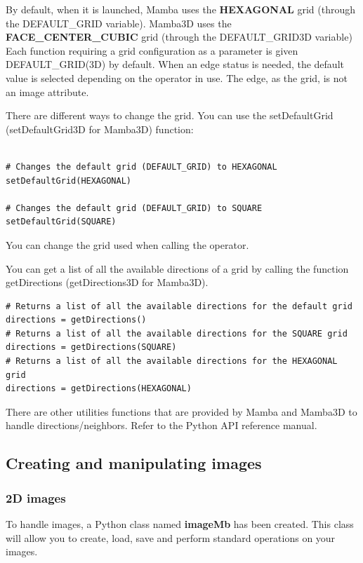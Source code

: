 \documentclass[a4paper,10pt,oneside]{article}
\begin{document}
By default, when it is launched, Mamba uses the \textbf{HEXAGONAL} grid (through 
the DEFAULT\_GRID variable). Mamba3D uses the \textbf{FACE\_CENTER\_CUBIC} grid
(through the DEFAULT\_GRID3D variable)  Each function requiring a grid
configuration as a parameter is given DEFAULT\_GRID(3D) by default. When an
edge status is needed, the default value is selected depending on the operator
in use. The edge, as the grid, is not an image attribute.

There are different ways to change the grid. You can use the setDefaultGrid 
(setDefaultGrid3D for Mamba3D) function:

\lstset{language=Python}
\begin{lstlisting}

# Changes the default grid (DEFAULT_GRID) to HEXAGONAL
setDefaultGrid(HEXAGONAL)

# Changes the default grid (DEFAULT_GRID) to SQUARE
setDefaultGrid(SQUARE)
\end{lstlisting}

You can change the grid used when calling the operator.

You can get a list of all the available directions of a grid
by calling the function getDirections (getDirections3D for Mamba3D).

\lstset{language=Python}
\begin{lstlisting}
# Returns a list of all the available directions for the default grid
directions = getDirections()
# Returns a list of all the available directions for the SQUARE grid
directions = getDirections(SQUARE)
# Returns a list of all the available directions for the HEXAGONAL grid
directions = getDirections(HEXAGONAL)
\end{lstlisting}

There are other utilities functions that are provided by Mamba and Mamba3D to
handle  directions/neighbors. Refer to the Python API reference manual.

\subsection{Creating and manipulating images}
\label{cha:create_im}

\subsubsection{2D images}

To handle images, a Python class named \textbf{imageMb} has been created. This class will allow
you to create, load, save and perform standard operations on your images.
\end{document}
